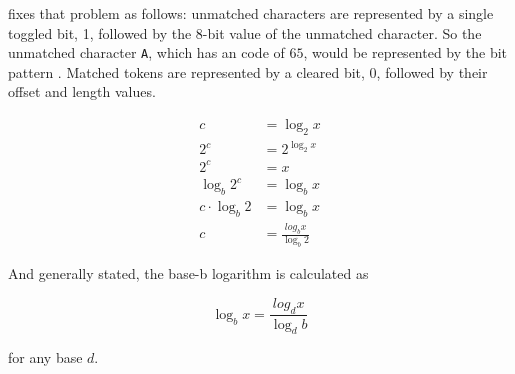 \lzss fixes that problem as follows: unmatched characters are
represented by a single toggled bit, 1, followed by the 8-bit value of
the unmatched character. So the unmatched character \texttt{A}, which
has an \ascii code of $65$, would be represented by the bit pattern
. Matched tokens are represented by a cleared bit,
0, followed by their offset and length values.

\answers{}

\begin{Answer}[ref={ex-bin-log}]

  \begin{align*}
    c & = \log_2 x \\
    2^c & = 2^{\log_2 x} \\
    2^c & = x \\
    \log_b 2^c &= \log_b x \\
    c \cdot \log_b 2 &= \log_b x \\
    c & = \frac{log_b x}{\log_b 2}
  \end{align*}

  And generally stated, the base-b logarithm is calculated as

  \begin{equation*}
    \log_b x = \frac{log_d x}{\log_d b}
  \end{equation*}

  for any base $d$.

\end{Answer}